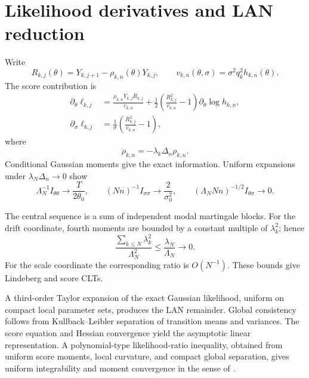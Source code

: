 \section{Likelihood derivatives and LAN reduction}

Write
\[
 R_{k,j}(\theta)=Y_{k,j+1}-\rho_{k,n}(\theta)Y_{k,j},
 \qquad
 v_{k,n}(\theta,\sigma)=\sigma^2q_k^2h_{k,n}(\theta).
\]
The score contribution is
\begin{align*}
 \partial_\theta\ell_{k,j}
 &=\frac{\dot\rho_{k,n}Y_{k,j}R_{k,j}}{v_{k,n}}
 +\frac12\left(\frac{R_{k,j}^2}{v_{k,n}}-1\right)
 \partial_\theta\log h_{k,n},\\
 \partial_\sigma\ell_{k,j}
 &=\frac1\sigma\left(\frac{R_{k,j}^2}{v_{k,n}}-1\right),
\end{align*}
where
\[
 \dot\rho_{k,n}=-\lambda_k\Delta_n\rho_{k,n}.
\]
Conditional Gaussian moments give the exact information. Uniform expansions under $\lambda_N\Delta_n\to0$ show
\[
 \Lambda_N^{-1}I_{\theta\theta}\to\frac{T}{2\theta_0},
 \qquad
 (Nn)^{-1}I_{\sigma\sigma}\to\frac{2}{\sigma_0^2},
 \qquad
 (\Lambda_NNn)^{-1/2}I_{\theta\sigma}\to0.
\]

The central sequence is a sum of independent modal martingale blocks. For the drift coordinate, fourth moments are bounded by a constant multiple of $\lambda_k^2$; hence
\[
 \frac{\sum_{k\le N}\lambda_k^2}{\Lambda_N^2}
 \le\frac{\lambda_N}{\Lambda_N}\to0.
\]
For the scale coordinate the corresponding ratio is $O(N^{-1})$. These bounds give Lindeberg and score CLTs.

A third-order Taylor expansion of the exact Gaussian likelihood, uniform on compact local parameter sets, produces the LAN remainder. Global consistency follows from Kullback--Leibler separation of transition means and variances. The score equation and Hessian convergence yield the asymptotic linear representation. A polynomial-type likelihood-ratio inequality, obtained from uniform score moments, local curvature, and compact global separation, gives uniform integrability and moment convergence in the sense of \citet{Yoshida2011}.
